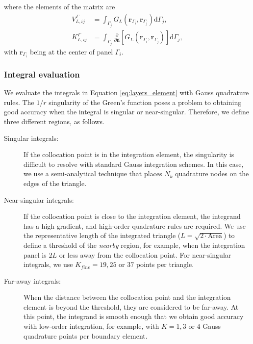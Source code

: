 %
where the elements of the matrix are
\begin{align} \label{eq:layers_element}
V_{L,ij}^{\Gamma} &= \int_{\Gamma_j} G_L(\mathbf{r}_{\Gamma_i},\mathbf{r}_{\Gamma_j})  \mathrm{d} \Gamma_j, \nonumber \\
K_{L,ij}^{\Gamma} &= \int_{\Gamma_j} \frac{\partial}{\partial \mathbf{n}} \left[ G_L(\mathbf{r}_{\Gamma_i},\mathbf{r}_{\Gamma_j}) \right]\mathrm{d} \Gamma_j,
\end{align}
%
with $\mathbf{r}_{\Gamma_i}$ being at the center of panel $\Gamma_i$.


\subsubsection{Integral evaluation}

We evaluate the integrals in Equation \eqref{eq:layers_element} with Gauss quadrature
rules. The $1/r$ singularity of the Green's function poses a
problem to obtaining good accuracy when the integral is 
singular or near-singular. Therefore, we define three different regions, as follows.
\begin{description}

\item[Singular integrals:] If the collocation point is in the integration element,
the singularity is difficult to resolve with standard
Gauss integration schemes. In this case, we use a semi-analytical technique 
\cite{HessSmith1967,ZhuHuangSongWhite2001} that places $N_k$ quadrature nodes on the 
edges of the triangle.

\item[Near-singular integrals:] If the collocation point is close to the integration element,
the integrand has a high gradient, and high-order quadrature rules are required. 
We use the representative length of the integrated triangle ($L = \sqrt{2\cdot\text{Area}}$)
to define a threshold of the \emph{nearby} region, for example, when the integration panel 
is $2L$ or less away from the collocation point. For near-singular integrals, we use 
$K_{fine}=19, 25  \text{ or }  37$ points per triangle. 

\item[Far-away integrals:] When the distance between the collocation point and the integration
element is beyond the threshold, they are considered to be far-away. 
At this point, the integrand is smooth enough that we obtain good 
accuracy with low-order integration, for example, with 
$K=1, 3  \text{ or } 4$ Gauss quadrature points per boundary element. 
\end{description}

